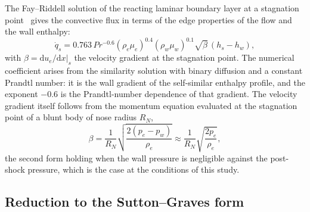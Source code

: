 The Fay--Riddell solution of the reacting laminar boundary layer at a stagnation point~\cite{fay1958stagnation} gives the convective flux in terms of the edge properties of the flow and the wall enthalpy:
\begin{equation}
    \dot{q}_s = 0.763\,Pr^{-0.6}\left(\rho_e\mu_e\right)^{0.4}\left(\rho_w\mu_w\right)^{0.1}\sqrt{\beta}\,\left(h_s - h_w\right) ,
    \label{eq:app_fr}
\end{equation}
with $\beta = \left.\mathrm{d}u_e/\mathrm{d}x\right|_{s}$ the velocity gradient at the stagnation point. The numerical coefficient arises from the similarity solution with binary diffusion and a constant Prandtl number: it is the wall gradient of the self-similar enthalpy profile, and the exponent $-0.6$ is the Prandtl-number dependence of that gradient. The velocity gradient itself follows from the momentum equation evaluated at the stagnation point of a blunt body of nose radius $R_N$,
\begin{equation}
    \beta = \frac{1}{R_N}\sqrt{\frac{2\left(p_e - p_w\right)}{\rho_e}} \approx \frac{1}{R_N}\sqrt{\frac{2p_e}{\rho_e}} ,
    \label{eq:app_beta_s}
\end{equation}
the second form holding when the wall pressure is negligible against the post-shock pressure, which is the case at the conditions of this study.

\subsection{Reduction to the Sutton--Graves form}

